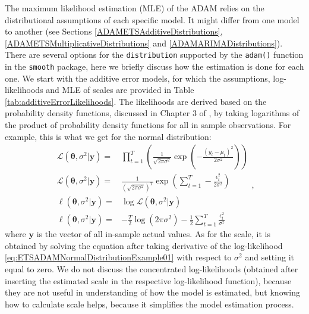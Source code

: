 \documentclass[
]{book}
\theoremstyle{definition}
\theoremstyle{definition}
\theoremstyle{definition}
\theoremstyle{definition}
\theoremstyle{remark}
\begin{document}
The maximum likelihood estimation (MLE) of the ADAM relies on the distributional assumptions of each specific model. It might differ from one model to another (see Sections \ref{ADAMETSAdditiveDistributions}, \ref{ADAMETSMultiplicativeDistributions} and \ref{ADAMARIMADistributions}). There are several options for the \texttt{distribution} supported by the \texttt{adam()} function in the \texttt{smooth} package, here we briefly discuss how the estimation is done for each one. We start with the additive error models, for which the assumptions, log-likelihoods and MLE of scales are provided in Table \ref{tab:additiveErrorLikelihoods}. The likelihoods are derived based on the probability density functions, discussed in Chapter 3 of \citet{SvetunkovSBA}, by taking logarithms of the product of probability density functions for all in sample observations. For example, this is what we get for the normal distribution:
\begin{equation}
  \begin{aligned}
    \mathcal{L}(\boldsymbol{\theta}, {\sigma}^2 | \mathbf{y}) = & \prod_{t=1}^T \left(\frac{1}{\sqrt{2 \pi \sigma^2}} \exp \left( -\frac{\left(y_t -\mu_t \right)^2}{2 \sigma^2} \right)\right) \\
    \mathcal{L}(\boldsymbol{\theta}, {\sigma}^2 | \mathbf{y}) = & \frac{1}{\left(\sqrt{2 \pi \sigma^2}\right)^T} \exp \left( \sum_{t=1}^T -\frac{\epsilon_t^2}{2 \sigma^2} \right) \\
    \ell(\boldsymbol{\theta}, {\sigma}^2 | \mathbf{y}) = & \log \mathcal{L}(\boldsymbol{\theta}, {\sigma}^2 | \mathbf{y}) \\
    \ell(\boldsymbol{\theta}, {\sigma}^2 | \mathbf{y}) = & -\frac{T}{2} \log(2 \pi \sigma^2) -\frac{1}{2} \sum_{t=1}^T \frac{\epsilon_t^2}{\sigma^2}
  \end{aligned},
  \label{eq:ETSADAMNormalDistributionExample01}
\end{equation}
where \(\mathbf{y}\) is the vector of all in-sample actual values. As for the scale, it is obtained by solving the equation after taking derivative of the log-likelihood \eqref{eq:ETSADAMNormalDistributionExample01} with respect to \(\sigma^2\) and setting it equal to zero. We do not discuss the concentrated log-likelihoods (obtained after inserting the estimated scale in the respective log-likelihood function), because they are not useful in understanding of how the model is estimated, but knowing how to calculate scale helps, because it simplifies the model estimation process.
\end{document}
